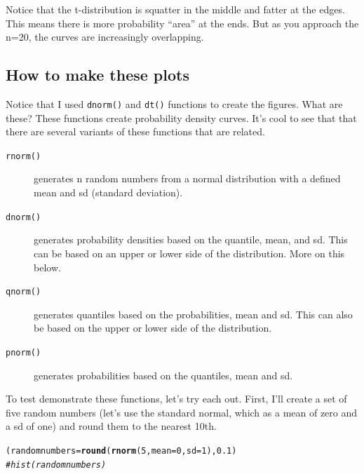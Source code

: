 \documentclass{tufte-handout}\usepackage[]{graphicx}\usepackage[]{color}
\makeatletter
\newcommand{\hlcom}[1]{\textcolor[rgb]{0.678,0.584,0.686}{\textit{#1}}}%
\newcommand{\hlkwd}[1]{\textcolor[rgb]{0.737,0.353,0.396}{\textbf{#1}}}%
\newenvironment{kframe}{%
 \def\at@end@of@kframe{}%
 \ifinner\ifhmode%
  \def\at@end@of@kframe{\end{minipage}}%
  \begin{minipage}{\columnwidth}%
 \fi\fi%
 \def\FrameCommand##1{\hskip\@totalleftmargin \hskip-\fboxsep
 \colorbox{shadecolor}{##1}\hskip-\fboxsep
     \hskip-\linewidth \hskip-\@totalleftmargin \hskip\columnwidth}%
 \MakeFramed {\advance\hsize-\width
   \@totalleftmargin\z@ \linewidth\hsize
   \@setminipage}}%
 {\par\unskip\endMakeFramed%
 \at@end@of@kframe}
\newenvironment{knitrout}{}{} %
\makeatother
\begin{document}
Notice that the t-distribution is squatter in the middle and fatter at the edges. This means there is more probability ``area'' at the ends. But as you approach the n=20, the curves are increasingly overlapping.

\subsection{How to make these plots}

Notice that I used \texttt{dnorm()} and \texttt{dt()} functions to create the figures. What are these? These functions create probability density curves. It's cool to see that that there are several variants of these functions that are related. 

\begin{description}
  \item[\texttt{rnorm()}] generates n random numbers from a normal distribution with a defined mean and sd (standard deviation).
  \item[\texttt{dnorm()}] generates probability densities based on the quantile, mean, and sd. This can be based on an upper or lower side of the distribution. More on this below.
  \item[\texttt{qnorm()}] generates quantiles based on the probabilities, mean and sd. This can also be based on the upper or lower side of the distribution. 
  \item[\texttt{pnorm()}] generates probabilities based on the quantiles, mean and sd.
\end{description}

\noindent To test demonstrate these functions, let's try each out. First, I'll create a set of five random numbers (let's use the standard normal, which as a mean of zero and a sd of one) and round them to the nearest 10th. 

\begin{knitrout}
\color{fgcolor}\begin{kframe}
\begin{alltt}
(randomnumbers = \hlkwd{round}(\hlkwd{rnorm}(5, mean=0, sd=1), 0.1)
\hlcom{#hist(randomnumbers)}
\end{alltt}


{\ttfamily\noindent\bfseries{}}\end{kframe}
\end{knitrout}
\end{document}
